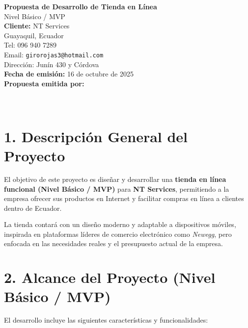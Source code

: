 \documentclass[12pt,a4paper]{article}
\begin{document}
\begin{titlepage}
    \centering
    \vspace*{2cm}
    {\Huge \textbf{Propuesta de Desarrollo de Tienda en Línea}}\\[0.5cm]
    {\Large Nivel Básico / MVP}\\[1.5cm]

    \textbf{Cliente:} NT Services\\
    Guayaquil, Ecuador\\
    Tel: 096 940 7289\\
    Email: \texttt{girorojas3@hotmail.com}\\
    Dirección: Junín 430 y Córdova\\[1cm]

    \textbf{Fecha de emisión:} 16 de octubre de 2025\\[4cm]

    \vfill
    \textbf{Propuesta emitida por:}\\
    [Tu nombre o empresa] \\
    [Tu correo] \\
    [Tu número de contacto]

    \vspace*{1cm}
\end{titlepage}

\section*{1. Descripción General del Proyecto}
El objetivo de este proyecto es diseñar y desarrollar una \textbf{tienda en línea funcional (Nivel Básico / MVP)} para \textbf{NT Services}, permitiendo a la empresa ofrecer sus productos en Internet y facilitar compras en línea a clientes dentro de Ecuador.

La tienda contará con un diseño moderno y adaptable a dispositivos móviles, inspirada en plataformas líderes de comercio electrónico como \textit{Newegg}, pero enfocada en las necesidades reales y el presupuesto actual de la empresa.

\section*{2. Alcance del Proyecto (Nivel Básico / MVP)}
El desarrollo incluye las siguientes características y funcionalidades:
\end{document}
